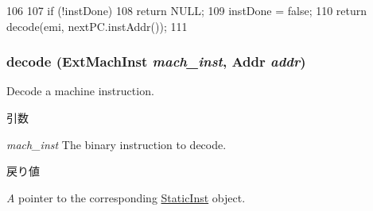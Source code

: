 \begin{DoxyCode}
106     {
107         if (!instDone)
108             return NULL;
109         instDone = false;
110         return decode(emi, nextPC.instAddr());
111     }
\end{DoxyCode}
\hypertarget{classMipsISA_1_1Decoder_a4ed948f8d08575cc2916fe32154ea69d}{
\subsubsection[{decode}]{ decode ({\bf ExtMachInst} {\em mach\_\-inst}, \/  {\bf Addr} {\em addr})}}
\label{classMipsISA_1_1Decoder_a4ed948f8d08575cc2916fe32154ea69d}
Decode a machine instruction. 
\begin{DoxyParams}{引数}
\item[{\em mach\_\-inst}]The binary instruction to decode. \end{DoxyParams}

\begin{DoxyRetVals}{戻り値}
\item[{\em A}]pointer to the corresponding \hyperlink{classStaticInst}{StaticInst} object. \end{DoxyRetVals}



